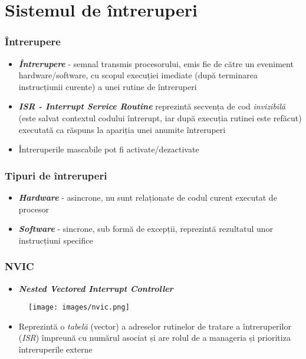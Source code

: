 \documentclass[xcolor={table}]{beamer}
\begin{document}
	\section{Sistemul de întreruperi}
		\begin{frame}
			\frametitle{Întrerupere}
			\begin{itemize}
			    \item \textbf{\textit{Întrerupere}} - semnal transmis procesorului, emis fie de către un eveniment hardware/software, cu scopul execuției imediate (după terminarea instrucțiunii curente) a unei rutine de întreruperi
			    \item \textbf{\textit{ISR - Interrupt Service Routine }} reprezintă secvența de cod \textit{invizibilă} (este salvat contextul codului întrerupt, iar după execuția rutinei este refăcut)  executată ca răspuns la apariția unei anumite întreruperi
			    \item Întreruperile mascabile pot fi activate/dezactivate
			\end{itemize}
		\end{frame}

				\begin{frame}
			\frametitle{Tipuri de întreruperi}
			\begin{itemize}
			    \item \textbf{\textit{Hardware}} - asincrone, nu sunt relaționate de codul curent executat de procesor
			    \item \textbf{\textit{Software}} - sincrone, sub formă de excepții, reprezintă rezultatul unor instrucțiuni specifice
			\end{itemize}
		\end{frame}

		\begin{frame}
			\frametitle{NVIC}
			\begin{itemize}
		       \item \textbf{\textit{Nested Vectored Interrupt Controller}}
			\end{itemize}
    			 \begin{figure}
                \centering
               \texttt{[image: images/nvic.png]}
            \end{figure}
            \begin{itemize}
		       \item Reprezintă o \textit{tabelă} (vector) a adreselor rutinelor de tratare a întreruperilor (\textit{ISR}) împreună cu numărul asociat și are rolul de a manageria și prioritiza întreruperile externe 
			\end{itemize}
		\end{frame}
		
\end{document}
